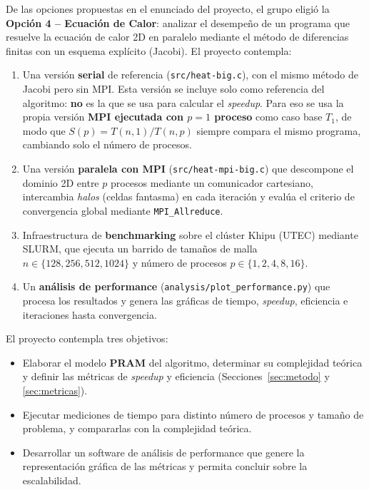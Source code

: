 \documentclass[11pt,a4paper]{article}
\begin{document}
	De las opciones propuestas en el enunciado del proyecto, el grupo eligió la
	\textbf{Opción 4 -- Ecuación de Calor}: analizar el desempeño de un programa que
	resuelve la ecuación de calor 2D en paralelo mediante el método de diferencias
	finitas con un esquema explícito (Jacobi). El proyecto contempla:
	\enlargethispage{3 \baselineskip}
	\begin{enumerate}
		\item Una versión \textbf{serial} de referencia (\texttt{src/heat-big.c}),
		con el mismo método de Jacobi pero sin MPI. Esta versión se incluye solo
		como referencia del algoritmo: \textbf{no} es la que se usa para calcular el
		\textit{speedup}. Para eso se usa la propia versión \textbf{MPI ejecutada con
		$p=1$ proceso} como caso base $T_1$, de modo que
		$S(p)=T(n,1)/T(n,p)$ siempre compara el mismo programa, cambiando solo el
		número de procesos.
		
		\item Una versión \textbf{paralela con MPI} (\texttt{src/heat-mpi-big.c}) que
		descompone el dominio 2D entre $p$ procesos mediante un comunicador
		cartesiano, intercambia \textit{halos} (celdas fantasma) en cada iteración y
		evalúa el criterio de convergencia global mediante \texttt{MPI\_Allreduce}.
		\item Infraestructura de \textbf{benchmarking} sobre el clúster Khipu (UTEC)
		mediante SLURM, que ejecuta un barrido de tamaños de malla
		$n \in \{128, 256, 512, 1024\}$ y número de procesos
		$p \in \{1, 2, 4, 8, 16\}$.
		\item Un \textbf{análisis de performance} (\texttt{analysis/plot\_performance.py})
		que procesa los resultados y genera las gráficas de tiempo, \textit{speedup},
		eficiencia e iteraciones hasta convergencia.
	\end{enumerate}

	El proyecto contempla tres objetivos:

	\begin{itemize}
		\item[\textbf{(a)}] Elaborar el modelo \textbf{PRAM} del algoritmo, determinar
		su complejidad teórica y definir las métricas de \textit{speedup} y eficiencia
		(Secciones~\ref{sec:metodo} y \ref{sec:metricas}).
		\item[\textbf{(b)}] Ejecutar mediciones de tiempo para distinto número de
		procesos y tamaño de problema, y compararlas con la complejidad teórica.
		\item[\textbf{(c)}] Desarrollar un software de análisis de performance que
		genere la representación gráfica de las métricas y permita concluir sobre la
		escalabilidad.
	\end{itemize}
\end{document}
